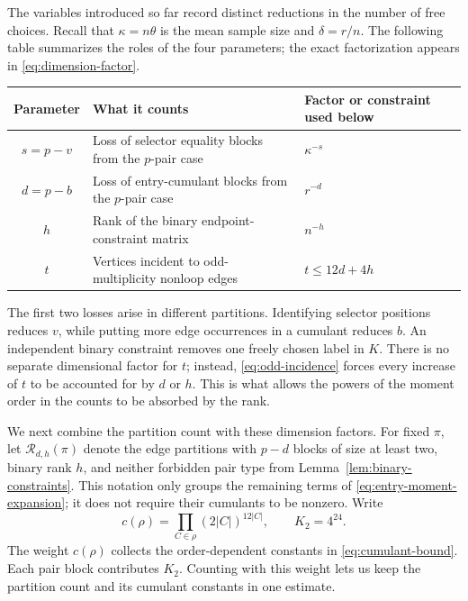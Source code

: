 \documentclass[11pt]{article}
\theoremstyle{definition}
\theoremstyle{remark}
\theoremstyle{plain}
\begin{document}
The variables introduced so far record distinct reductions in the
number of free choices. Recall that $\kappa=n\theta$ is the mean
sample size and $\delta=r/n$. The following table summarizes the
roles of the four parameters; the exact factorization appears in
\eqref{eq:dimension-factor}.
\begin{center}
\begin{tabular}{c|p{}|p{}}
Parameter & What it counts & Factor or constraint used below\\ \hline
$s=p-v$ & Loss of selector equality blocks from the $p$-pair case
         & $\kappa^{-s}$\\
$d=p-b$ & Loss of entry-cumulant blocks from the $p$-pair case
         & $r^{-d}$\\
$h$ & Rank of the binary endpoint-constraint matrix
     & $n^{-h}$\\
$t$ & Vertices incident to odd-multiplicity nonloop edges
     & $t\le12d+4h$
\end{tabular}
\end{center}
The first two losses arise in different partitions. Identifying
selector positions reduces $v$, while putting more edge
occurrences in a cumulant reduces $b$. An independent binary
constraint removes one freely chosen label in $K$.
There is no separate dimensional factor for $t$; instead,
\eqref{eq:odd-incidence} forces every increase of $t$ to be
accounted for by $d$ or $h$. This is what allows the powers
of the moment order in the counts to be absorbed by the rank.

We next combine the partition count with these dimension factors.
For fixed $\pi$, let $\mathcal R_{d,h}(\pi)$ denote the edge
partitions with $p-d$ blocks of size at least two, binary rank $h$,
and neither forbidden pair type from Lemma~\ref{lem:binary-constraints}.
This notation only groups the remaining terms of
\eqref{eq:entry-moment-expansion}; it does not require their
cumulants to be nonzero. Write
\[
 c(\rho)=\prod_{C\in\rho}(2|C|)^{12|C|},\qquad K_2=4^{24}.
\]
The weight $c(\rho)$ collects the order-dependent constants in
\eqref{eq:cumulant-bound}. Each pair block contributes $K_2$.
Counting with this weight lets us keep the partition count and its
cumulant constants in one estimate.
\end{document}
